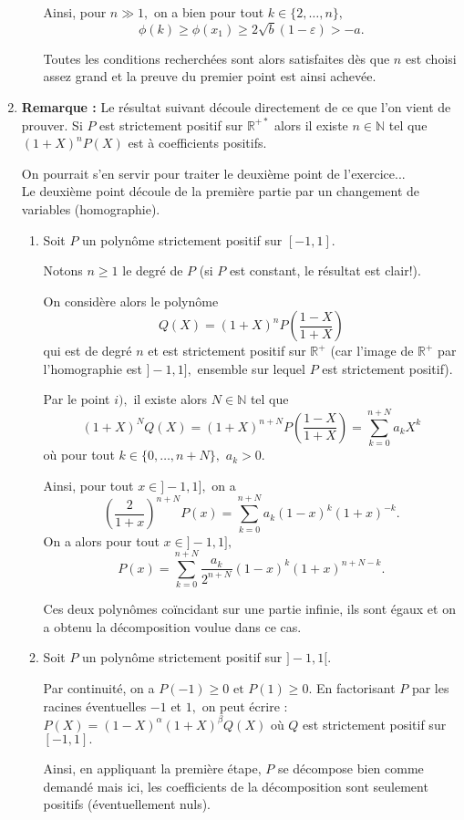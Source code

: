 \begin{enumerate}
\begin{enumerate}
Ainsi, pour $n\gg 1,$ on a bien pour tout $k\in\{2,\ldots,n\},$ $$ \phi(k)\geq  \phi(x_{1}) \geq 2\sqrt{b}(1-\varepsilon)>-a.$$

Toutes les conditions recherchées sont alors satisfaites dès que $n$ est choisi assez grand et la preuve du premier point est ainsi achevée.

\end{enumerate}

\item \textbf{Remarque :} Le résultat suivant découle directement de ce que l'on vient de prouver. Si $P$ est strictement positif sur $\mathbb{R}^{+*}$ alors il existe $n\in\mathbb{N}$ tel que $(1+X)^{n}P(X)$ est à coefficients positifs.

On pourrait s'en servir pour traiter le deuxième point de l'exercice...\\

Le deuxième point découle de la première partie par un changement de variables (homographie).

\begin{enumerate}
\item Soit $P$ un polynôme strictement positif sur $[-1,1].$ 

Notons $n\geq 1$ le degré de $P$ (si $P$ est constant, le résultat est clair!).

On considère alors le polynôme $$Q(X)=(1+X)^{n}P\left( \frac{1-X}{1+X} \right)$$ qui est de degré $n$ et est strictement positif sur $\mathbb{R}^{+}$ (car l'image de $\mathbb{R}^{+}$ par l'homographie est $]-1,1],$ ensemble sur lequel $P$ est strictement positif).

Par le point $i),$ il existe alors $N\in\mathbb{N}$ tel que $$(1+X)^{N}Q(X)=(1+X)^{n+N}P\left( \frac{1-X}{1+X} \right)=\sum_{k=0}^{n+N}a_{k}X^{k}$$ où pour tout $k\in\{0,\ldots,n+N\},$ $a_{k}>0.$

Ainsi, pour tout $x\in ]-1,1],$ on a $$\left(\frac{2}{1+x}\right)^{n+N}P(x)=\sum_{k=0}^{n+N}a_{k}(1-x)^{k}(1+x)^{-k}.$$
On a alors pour tout $x\in]-1,1],$ $$P(x)=\sum_{k=0}^{n+N}\frac{a_{k}}{2^{n+N}}(1-x)^{k}(1+x)^{n+N-k}.$$

Ces deux polynômes coïncidant sur une partie infinie, ils sont égaux et on a obtenu la décomposition voulue dans ce cas.

\item Soit $P$ un polynôme strictement positif sur $]-1,1[.$ 

Par continuité, on a $\displaystyle P(-1)\geq 0 \mbox{ et } P(1)\geq 0.$ En factorisant $P$ par les racines éventuelles $-1$ et $1,$ on peut écrire : $\displaystyle P(X)=(1-X)^{\alpha}(1+X)^{\beta}Q(X)$ où $Q$ est strictement positif sur $[-1,1].$ 

Ainsi, en appliquant la première étape, $P$ se décompose bien comme demandé mais ici, les coefficients de la décomposition sont seulement positifs (éventuellement nuls).
\end{enumerate}

\end{enumerate}

